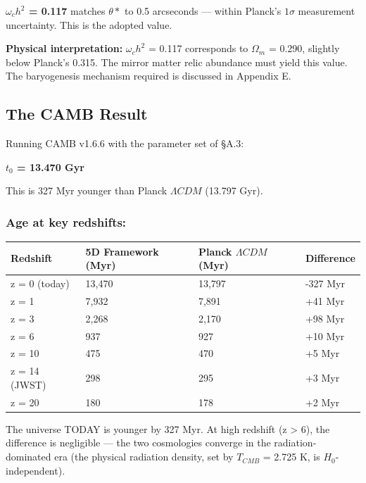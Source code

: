 \documentclass[aps,prd,preprint,superscriptaddress,longbibliography]{revtex4-2}
\begin{document}
\textbf{$\omega_c h^{2}$ = 0.117} matches $\theta*$ to 0.5 arcseconds --- within Planck's $1\sigma$ measurement uncertainty. This is the adopted value.

\textbf{Physical interpretation:} $\omega_c h^{2}$ = 0.117 corresponds to $\Omega_m$ = 0.290, slightly below Planck's 0.315. The mirror matter relic abundance must yield this value. The baryogenesis mechanism required is discussed in Appendix E.



\subsection{The CAMB Result}

Running CAMB v1.6.6 with the parameter set of \S{}A.3:

\textbf{$t_{0}$ = 13.470 Gyr}

This is 327 Myr younger than Planck $\Lambda CDM$ (13.797 Gyr).


\subsubsection{Age at key redshifts:}


\begin{table}[H]
\begin{ruledtabular}
\begin{tabular}{p{3.8cm}p{3.8cm}p{3.8cm}p{3.8cm}}
Redshift & 5D Framework (Myr) & Planck $\Lambda CDM$ (Myr) & Difference \\
\hline
z = 0 (today) & 13,470 & 13,797 & -327 Myr \\
z = 1 & 7,932 & 7,891 & +41 Myr \\
z = 3 & 2,268 & 2,170 & +98 Myr \\
z = 6 & 937 & 927 & +10 Myr \\
z = 10 & 475 & 470 & +5 Myr \\
z = 14 (JWST) & 298 & 295 & +3 Myr \\
z = 20 & 180 & 178 & +2 Myr \\
\end{tabular}
\end{ruledtabular}
\end{table}

The universe TODAY is younger by 327 Myr. At high redshift (z > 6), the difference is negligible --- the two cosmologies converge in the radiation-dominated era (the physical radiation density, set by $T_{CMB}$ = 2.725 K, is $H_{0}$-independent).
\end{document}
